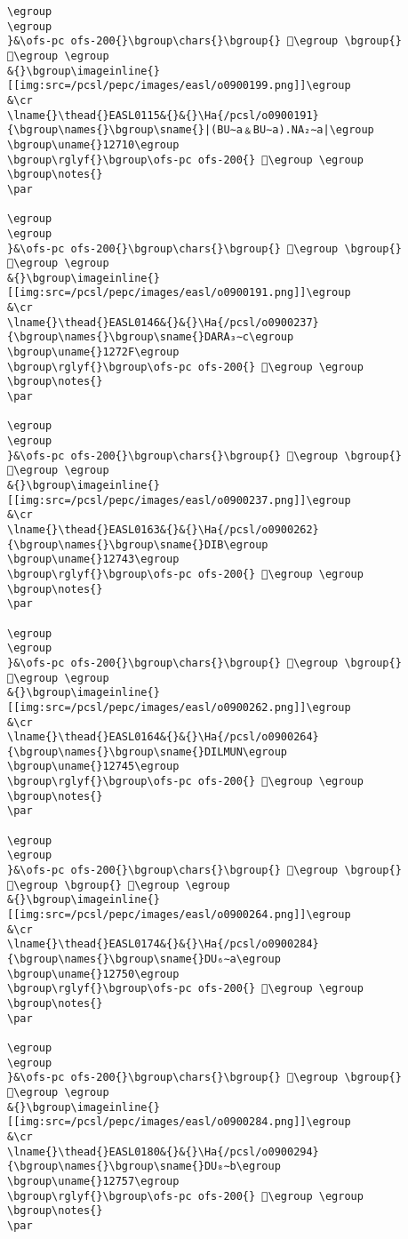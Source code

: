 \begin{verbatim}
\egroup
\egroup
}&\ofs-pc ofs-200{}\bgroup\chars{}\bgroup{} 𒜌\egroup \bgroup{} 𒜍\egroup \egroup
&{}\bgroup\imageinline{}[[img:src=/pcsl/pepc/images/easl/o0900199.png]]\egroup
&\cr
\lname{}\thead{}EASL0115&{}&{}\Ha{/pcsl/o0900191}{\bgroup\names{}\bgroup\sname{}|(BU∼a﹠BU∼a).NA₂∼a|\egroup
\bgroup\uname{}12710\egroup
\bgroup\rglyf{}\bgroup\ofs-pc ofs-200{} 𒜐\egroup \egroup
\bgroup\notes{}
\par 

\egroup
\egroup
}&\ofs-pc ofs-200{}\bgroup\chars{}\bgroup{} 𒜐\egroup \bgroup{} 𒜑\egroup \egroup
&{}\bgroup\imageinline{}[[img:src=/pcsl/pepc/images/easl/o0900191.png]]\egroup
&\cr
\lname{}\thead{}EASL0146&{}&{}\Ha{/pcsl/o0900237}{\bgroup\names{}\bgroup\sname{}DARA₃∼c\egroup
\bgroup\uname{}1272F\egroup
\bgroup\rglyf{}\bgroup\ofs-pc ofs-200{} 𒜯\egroup \egroup
\bgroup\notes{}
\par 

\egroup
\egroup
}&\ofs-pc ofs-200{}\bgroup\chars{}\bgroup{} 𒜯\egroup \bgroup{} 𒜲\egroup \egroup
&{}\bgroup\imageinline{}[[img:src=/pcsl/pepc/images/easl/o0900237.png]]\egroup
&\cr
\lname{}\thead{}EASL0163&{}&{}\Ha{/pcsl/o0900262}{\bgroup\names{}\bgroup\sname{}DIB\egroup
\bgroup\uname{}12743\egroup
\bgroup\rglyf{}\bgroup\ofs-pc ofs-200{} 𒝃\egroup \egroup
\bgroup\notes{}
\par 

\egroup
\egroup
}&\ofs-pc ofs-200{}\bgroup\chars{}\bgroup{} 𒝃\egroup \bgroup{} 𒝄\egroup \egroup
&{}\bgroup\imageinline{}[[img:src=/pcsl/pepc/images/easl/o0900262.png]]\egroup
&\cr
\lname{}\thead{}EASL0164&{}&{}\Ha{/pcsl/o0900264}{\bgroup\names{}\bgroup\sname{}DILMUN\egroup
\bgroup\uname{}12745\egroup
\bgroup\rglyf{}\bgroup\ofs-pc ofs-200{} 𒝅\egroup \egroup
\bgroup\notes{}
\par 

\egroup
\egroup
}&\ofs-pc ofs-200{}\bgroup\chars{}\bgroup{} 𒝇\egroup \bgroup{} 𒝅\egroup \bgroup{} 𒝆\egroup \egroup
&{}\bgroup\imageinline{}[[img:src=/pcsl/pepc/images/easl/o0900264.png]]\egroup
&\cr
\lname{}\thead{}EASL0174&{}&{}\Ha{/pcsl/o0900284}{\bgroup\names{}\bgroup\sname{}DU₆∼a\egroup
\bgroup\uname{}12750\egroup
\bgroup\rglyf{}\bgroup\ofs-pc ofs-200{} 𒝐\egroup \egroup
\bgroup\notes{}
\par 

\egroup
\egroup
}&\ofs-pc ofs-200{}\bgroup\chars{}\bgroup{} 𒝑\egroup \bgroup{} 𒝐\egroup \egroup
&{}\bgroup\imageinline{}[[img:src=/pcsl/pepc/images/easl/o0900284.png]]\egroup
&\cr
\lname{}\thead{}EASL0180&{}&{}\Ha{/pcsl/o0900294}{\bgroup\names{}\bgroup\sname{}DU₈∼b\egroup
\bgroup\uname{}12757\egroup
\bgroup\rglyf{}\bgroup\ofs-pc ofs-200{} 𒝗\egroup \egroup
\bgroup\notes{}
\par 


\end{verbatim}
